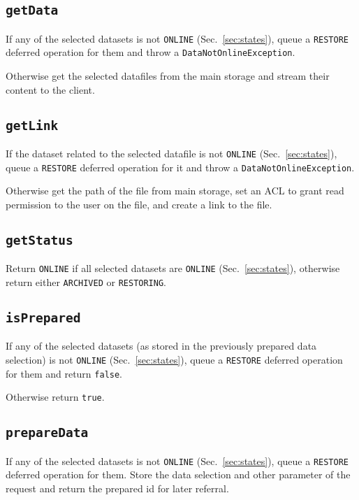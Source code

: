 \documentclass[paper=a4]{scrartcl}
\begin{document}
\subsection{\texttt{getData}}

If any of the selected datasets is not \texttt{ONLINE}
(Sec.\ \ref{sec:states}), queue a \texttt{RESTORE} deferred operation
for them and throw a \texttt{DataNotOnlineException}.

Otherwise get the selected datafiles from the main storage and stream
their content to the client.

\subsection{\texttt{getLink}}

If the dataset related to the selected datafile is not \texttt{ONLINE}
(Sec.\ \ref{sec:states}), queue a \texttt{RESTORE} deferred operation
for it and throw a \texttt{DataNotOnlineException}.

Otherwise get the path of the file from main storage, set an ACL to
grant read permission to the user on the file, and create a link to
the file.

\subsection{\texttt{getStatus}}

Return \texttt{ONLINE} if all selected datasets are \texttt{ONLINE}
(Sec.\ \ref{sec:states}), otherwise return either \texttt{ARCHIVED} or
\texttt{RESTORING}.

\subsection{\texttt{isPrepared}}

If any of the selected datasets (as stored in the previously prepared
data selection) is not \texttt{ONLINE} (Sec.\ \ref{sec:states}), queue
a \texttt{RESTORE} deferred operation for them and return
\texttt{false}.

Otherwise return \texttt{true}.

\subsection{\texttt{prepareData}}

If any of the selected datasets is not \texttt{ONLINE}
(Sec.\ \ref{sec:states}), queue a \texttt{RESTORE} deferred operation
for them.  Store the data selection and other parameter of the request
and return the prepared id for later referral.
\end{document}
